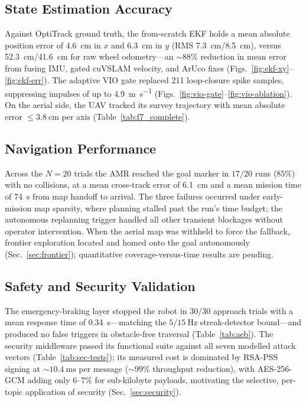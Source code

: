 \documentclass[conference]{IEEEtran}
\begin{document}
\subsection{State Estimation Accuracy}
Against OptiTrack ground truth, the from-scratch EKF holds a mean absolute
position error of \SI{4.6}{\centi\meter} in $x$ and \SI{6.3}{\centi\meter} in $y$
(RMS \SI{7.3}{\centi\meter}/\SI{8.5}{\centi\meter}), versus
\SI{52.3}{\centi\meter}/\SI{41.6}{\centi\meter} for raw wheel odometry---an
${\sim}88\%$ reduction in mean error from fusing IMU, gated cuVSLAM velocity, and
ArUco fixes (Figs.~\ref{fig:ekf-xy}--\ref{fig:ekf-err}). The adaptive VIO gate
replaced \num{211} loop-closure spike samples, suppressing impulses of up to
\SI{4.9}{\meter\per\second} (Figs.~\ref{fig:vio-gate}--\ref{fig:vio-ablation}). On
the aerial side, the UAV tracked its survey trajectory with mean absolute error
$\leq\SI{3.8}{\centi\meter}$ per axis (Table~\ref{tab:f7_complete}).

\subsection{Navigation Performance}
Across the $N=20$ trials the AMR reached the goal marker in $17/20$ runs
($85\%$) with no collisions, at a mean cross-track error of \SI{6.1}{\centi\meter}
and a mean mission time of \SI{74}{\second} from map handoff to arrival. The three
failures occurred under early-mission map sparsity, where planning stalled past the
run's time budget; the autonomous replanning trigger handled all other transient
blockages without operator intervention. When the aerial map was withheld to force the
fallback, frontier exploration located and homed onto the goal autonomously
(Sec.~\ref{sec:frontier}); quantitative coverage-versus-time results are pending.

\subsection{Safety and Security Validation}
The emergency-braking layer stopped the robot in $30/30$ approach trials with a
mean response time of \SI{0.34}{\second}---matching the $5/\SI{15}{\hertz}$
streak-detector bound---and produced no false triggers in obstacle-free traversal
(Table~\ref{tab:aeb}). The security middleware passed its functional suite against
all seven modelled attack vectors (Table~\ref{tab:sec-tests}); its measured cost is
dominated by RSA-PSS signing at ${\sim}\SI{10.4}{\milli\second}$ per message
(${\sim}99\%$ throughput reduction), with AES-256-GCM adding only $6$--$7\%$ for
sub-kilobyte payloads, motivating the selective, per-topic application of security
(Sec.~\ref{sec:security}).
\end{document}
